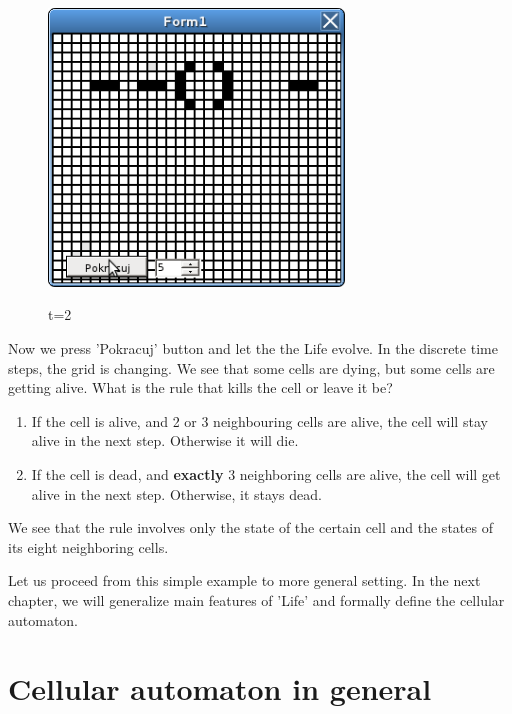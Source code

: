 \begin{figure}
 \centering
 \includegraphics[width=0.7\textwidth]{./img/gol3}
 \label{gol2}
 \caption{t=2}
\end{figure}

Now we press 'Pokracuj' button and let the the Life evolve.
In the discrete time steps, the grid is changing.
We see that some cells are dying, but some cells are getting alive. 
What is the rule that kills the cell or leave it be? 

\begin{enumerate}
\item If the cell is alive, and 2 or 3 neighbouring cells are alive, the cell will stay alive in the next step. Otherwise it will die.
\item If the cell is dead, and \textbf{exactly} 3 neighboring cells are alive, the cell will get alive in the next step. Otherwise, it stays dead.

\end{enumerate}
We see that the rule involves only the state of the certain cell and the states of its eight neighboring cells.


Let us proceed from this simple example to more general setting.
In the next chapter, we will generalize main features of 'Life' and formally define the cellular automaton.

\section{Cellular automaton in general}


